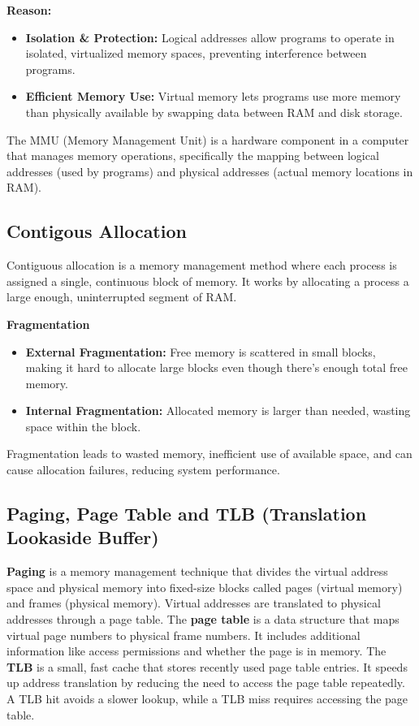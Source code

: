 \documentclass{article}
\begin{document}
{\bf Reason:}
\begin{itemize}
    \item {\bf Isolation \& Protection:} Logical addresses allow programs to operate in isolated, virtualized memory spaces, preventing interference between programs.
    \item {\bf Efficient Memory Use:} Virtual memory lets programs use more memory than physically available by swapping data between RAM and disk storage.
\end{itemize}

The MMU (Memory Management Unit) is a hardware component in a computer that manages memory operations,
specifically the mapping between logical addresses (used by programs) and physical addresses
(actual memory locations in RAM).

\subsection{Contigous Allocation}

Contiguous allocation is a memory management method where each process is assigned a single, 
continuous block of memory. 
It works by allocating a process a large enough, uninterrupted segment of RAM.

{\bf Fragmentation}
\begin{itemize}
    \item {\bf External Fragmentation:} Free memory is scattered in small blocks, making it hard to allocate large blocks even though there’s enough total free memory.
    \item {\bf Internal Fragmentation:} Allocated memory is larger than needed, wasting space within the block.
\end{itemize}
Fragmentation leads to wasted memory, inefficient use of available space, and can cause allocation failures, reducing system performance.

\subsection{Paging, Page Table and TLB (Translation Lookaside Buffer)}
{\bf Paging} is a memory management technique that divides the virtual address space and physical memory into fixed-size blocks called pages (virtual memory) and frames (physical memory). Virtual addresses are translated to physical addresses through a page table.
\newline
\newline
The {\bf page table} is a data structure that maps virtual page numbers to physical frame numbers. It includes additional information like access permissions and whether the page is in memory.
\newline
\newline
The {\bf TLB} is a small, fast cache that stores recently used page table entries. It speeds up address translation by reducing the need to access the page table repeatedly. A TLB hit avoids a slower lookup, while a TLB miss requires accessing the page table.
\end{document}
